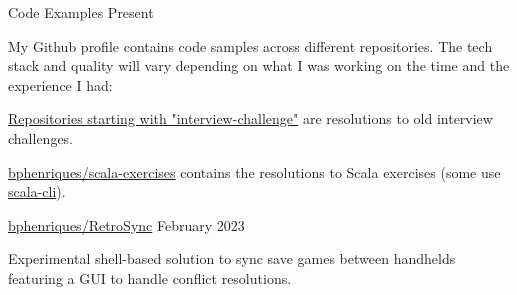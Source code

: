 \begin{cventries}
  \vspace{2mm}

    
\openSourceEntry
    {Code Examples}
    {Present}
    {   
    \begin{openSourceDescription}
    My Github profile contains code samples across different repositories. The tech stack and quality will vary depending on what I was working on the time and the experience I had:
    \end{openSourceDescription}
    \vspace{8mm}
    \begin{openSourceItems}
        \item \href{https://github.com/bphenriques?tab=repositories&q=interview-challenge&type=&language=&sort=}{Repositories starting with "interview-challenge"} are resolutions to old interview challenges.
        \item \href{https://github.com/bphenriques/scala-exercises}{bphenriques/scala-exercises} contains the resolutions to Scala exercises (some use \href{https://scala-cli.virtuslab.org/}{scala-cli}).
    \end{openSourceItems}
    \vspace{4mm}
    }

  \vspace{2mm}

\openSourceEntry
    {\href{https://github.com/bphenriques/knowledge-base}{bphenriques/RetroSync}}
    {February 2023}
    {   
    \begin{openSourceDescription}
    Experimental shell-based solution to sync save games between handhelds featuring a GUI to handle conflict resolutions.
    \end{openSourceDescription}
    \vspace{4mm}
    }
    
\end{cventries}
